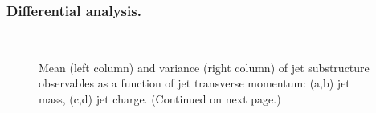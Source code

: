         \subsubsection{Differential analysis.}
\begin{figure}
    \centering
    \\
    \caption[Momentum dependent differential moments of jet substructure observables]{Mean (left column) and variance (right column) of jet substructure observables as a function of jet transverse momentum: (a,b) jet mass, (c,d) jet charge. (Continued on next page.)}
    \label{fig:pjetmoments}
\end{figure}

